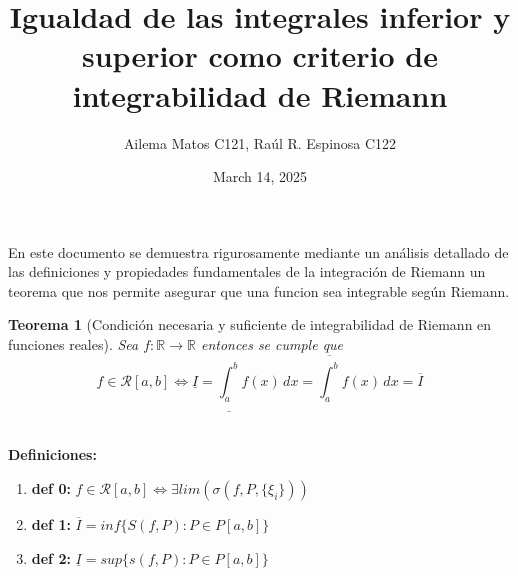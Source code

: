 \documentclass{article}
\title{Igualdad de las integrales inferior y superior como criterio de integrabilidad de Riemann}
\author{
Ailema Matos C121,
Raúl R. Espinosa C122 
}
\date{March 14, 2025}
\newtheorem{theorem}{Teorema}
\begin{document}
\maketitle

\section*{}

En este documento se demuestra rigurosamente mediante un análisis detallado de las definiciones y propiedades fundamentales de la integración de Riemann 
un teorema que nos permite asegurar que una funcion sea integrable según Riemann.\\

\begin{theorem}[Condición necesaria y suficiente de integrabilidad de Riemann en funciones reales]
Sea \( f: \mathbb{R} \to \mathbb{R} \) entonces se cumple que \[f \in \mathcal{R}[a, b] \Longleftrightarrow \underline{I} = \underline{\int_a^b} f(x) \, dx = \overline{\int_a^b} f(x) \, dx = \overline{I}\]\\
\end{theorem}

\textbf{Definiciones:}

\begin{enumerate}
   \item \textbf{def 0:} \(f \in \mathcal{R}[a, b] \Longleftrightarrow   \exists lim(\sigma(f, P,\{\xi_i\}))\)
    \item \textbf{def 1:}  \(\overline{I} = inf \{ S(f, P): P \in P[a, b] \} \)  
    \item \textbf{def 2:}  \(\underline{I} = sup\{ s(f, P): P \in P[a, b] \} \)
\end{enumerate} 
\end{document}
